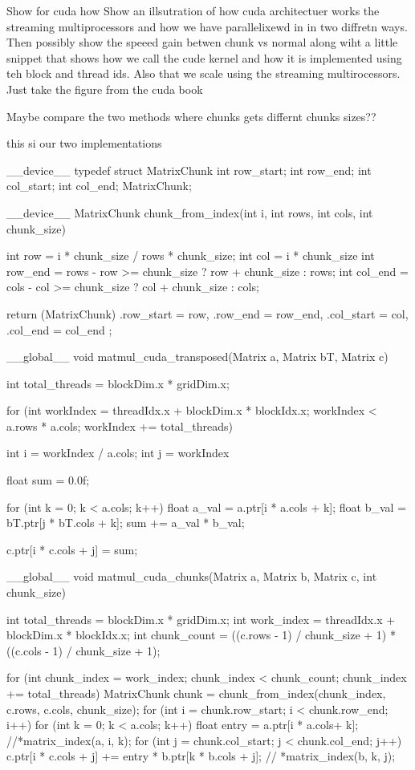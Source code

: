 Show for cuda how 
Show an illsutration of how cuda architectuer works the streaming multiprocessors and how we have parallelixewd in in two diffretn ways. 
Then possibly show the speeed gain betwen chunk vs normal along wiht a little snippet that shows how we call the cude kernel and how it is implemented 
using teh block and thread ids. Also that we scale using the streaming multirocessors.
Just take the figure from the cuda book


Maybe compare the two methods where chunks gets differnt chunks sizes??

this si our two implementations



__device__ typedef struct MatrixChunk {
    int row_start;
    int row_end;
    int col_start;
    int col_end;
} MatrixChunk;

__device__ MatrixChunk chunk_from_index(int i, int rows, int cols, int chunk_size) {
    int row = i * chunk_size / rows * chunk_size;
    int col = i * chunk_size %
    int row_end = rows - row >= chunk_size ? row + chunk_size : rows;
    int col_end = cols - col >= chunk_size ? col + chunk_size : cols;

    return (MatrixChunk) {
        .row_start = row,
        .row_end = row_end,
        .col_start = col,
        .col_end = col_end
    };
}



__global__ void matmul_cuda_transposed(Matrix a, Matrix bT, Matrix c) {
    int total_threads = blockDim.x * gridDim.x;

    for (int workIndex = threadIdx.x + blockDim.x * blockIdx.x;
         workIndex < a.rows * a.cols;
         workIndex += total_threads)
    {
        int i = workIndex / a.cols;
        int j = workIndex %

        float sum = 0.0f;

        for (int k = 0; k < a.cols; k++) {
            float a_val = a.ptr[i * a.cols + k];
            float b_val = bT.ptr[j * bT.cols + k];
            sum += a_val * b_val;
        }

        c.ptr[i * c.cols + j] = sum;
    }
}

__global__ void matmul_cuda_chunks(Matrix a, Matrix b, Matrix c, int chunk_size) {
    int total_threads = blockDim.x * gridDim.x;
    int work_index = threadIdx.x + blockDim.x * blockIdx.x;
    int chunk_count = ((c.rows - 1) / chunk_size + 1) * ((c.cols - 1) / chunk_size + 1);

    for (int chunk_index = work_index; chunk_index < chunk_count; chunk_index += total_threads) {
        MatrixChunk chunk = chunk_from_index(chunk_index, c.rows, c.cols, chunk_size);
        for (int i = chunk.row_start; i < chunk.row_end; i++) {
            for (int k = 0; k < a.cols; k++) {
                float entry = a.ptr[i * a.cols+ k]; //*matrix_index(a, i, k);
                for (int j = chunk.col_start; j < chunk.col_end; j++) {
                    c.ptr[i * c.cols + j] += entry * b.ptr[k * b.cols + j]; // *matrix_index(b, k, j);
                }
            }
        }
    }
}


